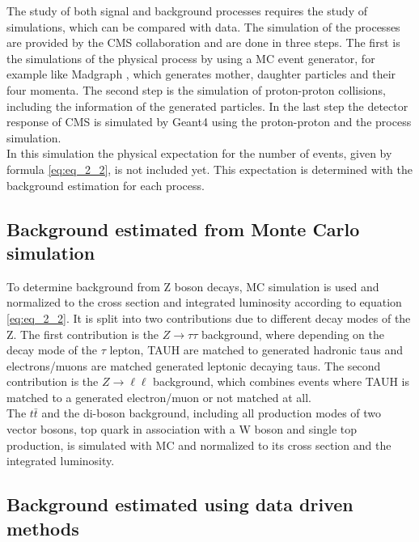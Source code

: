 The study of both signal and background processes requires the study of simulations, which can be compared with data. The simulation of the processes are provided by the \gls{CMS} collaboration and are done in three steps. The first is the simulations of the physical process by using a \gls{MC} event generator, for example like Madgraph \cite{MADGRAPH}, which generates mother, daughter particles and their four momenta. The second step is the simulation of proton-proton collisions, including the information of the generated particles. In the last step the detector response of \gls{CMS} is simulated by Geant4 \cite{GEANT4} using the proton-proton and the process simulation. \\

In this simulation the physical expectation for the number of events, given by formula \ref{eq:eq_2_2}, is not included yet. This expectation is determined with the background estimation for each process.

\subsection{Background estimated from Monte Carlo simulation}
\label{sec:section_3_4_1}

To determine background from Z boson decays, \gls{MC} simulation is used and normalized to the cross section and integrated luminosity according to equation \ref{eq:eq_2_2}. It is split into two contributions due to different decay modes of the Z. The first contribution is the $Z\to\tau\tau$ background, where depending on the decay mode of the $\tau$ lepton, \gls{TAUH} are matched to generated hadronic taus and electrons/muons are matched generated leptonic decaying taus. The second contribution is the $Z\to\ell\ell$ background, which combines events where \gls{TAUH} is matched to a generated electron/muon or not matched at all. \\ 

The $t\bar{t}$ and the di-boson background, including all production modes of two vector bosons, top quark in association with a W boson and single top production, is simulated with \gls{MC} and normalized to its cross section and the integrated luminosity. 


\subsection{Background estimated using data driven methods}
\label{sec:section_3_4_2}

